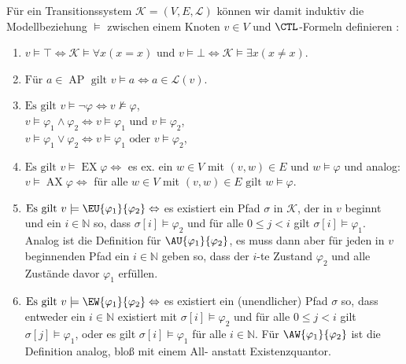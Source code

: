 \begin{definition}
	Für ein Transitionssystem $\mathcal{K}=(V,E,\mathcal{L})$ können wir damit induktiv die Modellbeziehung $\models$ zwischen einem Knoten $v\in V$ und $\CTL$-Formeln definieren \cite{baier2008principles}:
	\begin{enumerate}
		\item $v\models \top \Leftrightarrow \mathcal{K}\models\forall x(x=x)\text{ und }v\models \bot \Leftrightarrow \mathcal{K}\models\exists x(x\neq x)$.
		\item $\text{Für }a\in \operatorname{AP}\text{ gilt }v\models a \Leftrightarrow a\in \mathcal{L}(v)$.
		\item $\text{Es gilt }v\models \neg \varphi \Leftrightarrow v\not\models \varphi$,\\
		$v\models \varphi_1 \land \varphi_2 \Leftrightarrow v\models \varphi_1 \text{ und } v\models \varphi_2$,\\
		$v\models \varphi_1 \lor \varphi_2 \Leftrightarrow v\models \varphi_1 \text{ oder } v\models \varphi_2$,
		\item $\text{Es gilt }v\models \operatorname{EX}\varphi \Leftrightarrow$ es ex. ein $w\in V$ mit $(v,w)\in E\text{ und }w\models \varphi$ und analog:\\ 
		$v\models \operatorname{AX}\varphi \Leftrightarrow$ für alle $w\in V$ mit $(v,w)\in E\text{ gilt }w\models \varphi$.
		\item $\text{Es gilt }v\models \EU{\varphi_1}{\varphi_2} \Leftrightarrow$ es existiert ein Pfad $\sigma$ in $\mathcal{K}$, der in $v$ beginnt und ein $i\in \mathbb{N}$ so, dass $\sigma[i]\models \varphi_2$ und für alle $0\leq j < i$ gilt $\sigma[i]\models \varphi_1$. 
		Analog ist die Definition für $\AU{\varphi_1}{\varphi_2}$, es muss dann aber für jeden in $v$ beginnenden Pfad ein $i\in \mathbb{N}$ geben so, dass der $i$-te Zustand $\varphi_2$ und alle Zustände davor $\varphi_1$ erfüllen.
		\item $\text{Es gilt }v\models \EW{\varphi_1}{\varphi_2} \Leftrightarrow$ es existiert ein (unendlicher) Pfad $\sigma$ so, dass entweder ein $i\in \mathbb{N}$ existiert mit $\sigma[i]\models \varphi_2$ und für alle $0\leq j < i$ gilt $\sigma[j]\models \varphi_1$, oder es gilt $\sigma[i]\models \varphi_1$ für alle $i\in \mathbb{N}$.
		Für $\AW{\varphi_1}{\varphi_2}$ ist die Definition analog, bloß mit einem All- anstatt Existenzquantor.
	\end{enumerate}
\end{definition}

